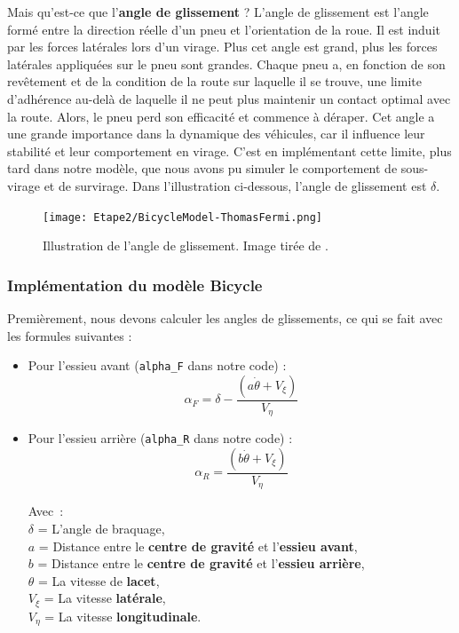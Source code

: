 Mais qu'est-ce que l'\textbf{angle de glissement} ? L'angle de glissement est l'angle formé entre la direction réelle d'un pneu et l'orientation de la roue. Il est induit par les forces latérales lors d'un virage. Plus cet angle est grand, plus les forces latérales appliquées sur le pneu sont grandes. Chaque pneu a, en fonction de son revêtement et de la condition de la route sur laquelle il se trouve, une limite d'adhérence au-delà de laquelle il ne peut plus maintenir un contact optimal avec la route. Alors, le pneu perd son efficacité et commence à déraper. Cet angle a une grande importance dans la dynamique des véhicules, car il influence leur stabilité et
leur comportement en virage.
C'est en implémentant cette limite, plus tard dans notre modèle, que nous avons pu simuler le comportement de sous-virage et de survirage.
Dans l'illustration ci-dessous, l'angle de glissement est $\delta$.
\begin{figure}[h]
    \centering
    \texttt{[image: Etape2/BicycleModel-ThomasFermi.png]}
    \caption{Illustration de l'angle de glissement. Image tirée de \cite{fermi2023}.}
    \label{fig:bicycle_model}
\end{figure}

\subsubsection{Implémentation du modèle Bicycle}
Premièrement, nous devons calculer les angles de glissements, ce qui se fait avec les formules suivantes :

\begin{itemize}
    \item Pour l'essieu avant (\texttt{alpha\_F} dans notre code) :
    $$\alpha_F = \delta - \frac{(a \dot{\theta}+V_{\xi})}{V_\eta}$$
    \item Pour l'essieu arrière (\texttt{alpha\_R} dans notre code) :
    $$\alpha_R = \frac{(b \dot{\theta}+V_{\xi})}{V_\eta} $$

    Avec :\\
$\delta$ = L'angle de braquage, \\
$a$ = Distance entre le \textbf{centre de gravité} et l'\textbf{essieu avant},\\
$b$ = Distance entre le \textbf{centre de gravité} et l'\textbf{essieu arrière},\\
$\theta$ = La vitesse de \textbf{lacet}, \\
$V_\xi$ = La vitesse \textbf{latérale}, \\
$V_\eta$ = La vitesse \textbf{longitudinale}. \\

\end{itemize}


